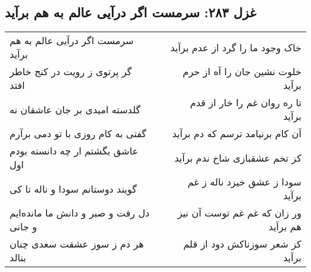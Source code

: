 \begin{center}
\section*{غزل ۲۸۳: سرمست اگر درآیی عالم به هم برآید}
\label{sec:283}
\begin{longtable}{l p{0.5cm} r}
سرمست اگر درآیی عالم به هم برآید
&&
خاک وجود ما را گرد از عدم برآید
\\
گر پرتوی ز رویت در کنج خاطر افتد
&&
خلوت نشین جان را آه از حرم برآید
\\
گلدسته امیدی بر جان عاشقان نه
&&
تا ره روان غم را خار از قدم برآید
\\
گفتی به کام روزی با تو دمی برآرم
&&
آن کام برنیامد ترسم که دم برآید
\\
عاشق بگشتم ار چه دانسته بودم اول
&&
کز تخم عشقبازی شاخ ندم برآید
\\
گویند دوستانم سودا و ناله تا کی
&&
سودا ز عشق خیزد ناله ز غم برآید
\\
دل رفت و صبر و دانش ما مانده‌ایم و جانی
&&
ور زان که غم غم توست آن نیز هم برآید
\\
هر دم ز سوز عشقت سعدی چنان بنالد
&&
کز شعر سوزناکش دود از قلم برآید
\\
\end{longtable}
\end{center}

